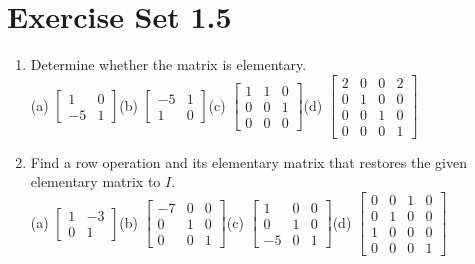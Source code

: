 \documentclass{article}
\theoremstyle{mystyle}
\begin{document}
\section*{Exercise Set 1.5}
\begin{enumerate}
    \item[1.] Determine whether the matrix is elementary.\\
    (a) $\begin{bmatrix}1&0\\-5&1\end{bmatrix}$\quad (b) $\begin{bmatrix}-5&1\\1&0\end{bmatrix}$\quad (c) $\begin{bmatrix}1&1&0\\0&0&1\\0&0&0\end{bmatrix}$\quad (d) $\begin{bmatrix}2&0&0&2\\0&1&0&0\\0&0&1&0\\0&0&0&1\end{bmatrix}$

    \item[3.] Find a row operation and its elementary matrix that restores the given elementary matrix to $I$.\\
    (a) $\begin{bmatrix}1&-3\\0&1\end{bmatrix}$\quad (b) $\begin{bmatrix}-7&0&0\\0&1&0\\0&0&1\end{bmatrix}$\quad (c) $\begin{bmatrix}1&0&0\\0&1&0\\-5&0&1\end{bmatrix}$\quad (d) $\begin{bmatrix}0&0&1&0\\0&1&0&0\\1&0&0&0\\0&0&0&1\end{bmatrix}$


\end{enumerate}
\end{document}
